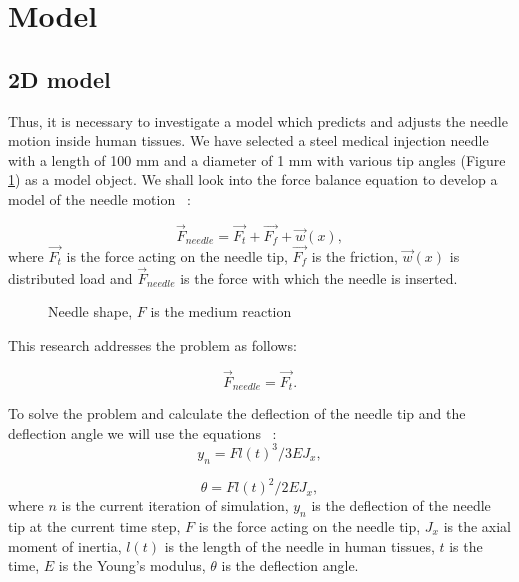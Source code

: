 \documentclass[a4paper]{jpconf}
\begin{document}
\section{Model}
\subsection{2D model}

Thus, it is necessary to investigate a model which predicts and adjusts the needle motion inside human tissues. We have selected a steel medical injection needle with a length of 100 mm and a diameter of 1 mm with various tip angles (Figure  \ref{n1}) as a model object. We shall look into the force balance equation to develop a model of the needle motion ~\cite{Model}:

\begin{equation} \label{eq1}
\vec{F}_{needle} = \vec{F_{t}} + \vec{F_{f}} + \vec{w}(x),
\end{equation}
where $\vec{F_{t}}$ is the force acting on the needle tip, $\vec{F_{f}}$ is the friction, $\vec{w}(x)$ is distributed load and $\vec{F}_{needle}$ is the force with which the needle is inserted.

\begin{figure}[h]
\caption{Needle shape, $F$ is the medium reaction}
\label{n1}
\end{figure}

This research addresses the problem as follows:

\begin{equation} \label{eq2}
\vec{F}_{needle} = \vec{F_{t}}.
\end{equation}

To solve the problem and calculate the deflection of the needle tip and the deflection angle we will use the equations ~\cite{Model}:
\begin{equation} \label{eq3}
y_{n} = Fl(t)^3 / 3EJ_{x},
\end{equation}

\begin{equation} \label{eq4}
\theta = Fl(t)^2 / 2EJ_{x},
\end{equation}
where  $n$ is the current iteration of simulation, $y_{n}$ is the deflection of the needle tip at the current time step,
$F$  is the force acting on the needle tip, $J_{x}$  is the axial moment of inertia, 
$l(t)$  is the length of the needle in human tissues, $t$  is the time, $E$  is the Young's modulus, $\theta$  is the deflection angle.
\end{document}

